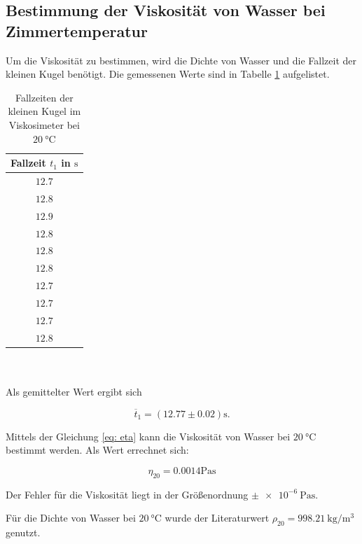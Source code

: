 \subsection{Bestimmung der Viskosität von Wasser bei Zimmertemperatur} \label{sec:visko}
Um die Viskosität zu bestimmen, wird die Dichte von Wasser und die Fallzeit der kleinen Kugel benötigt.
Die gemessenen Werte sind in Tabelle \ref{tab:messwerte_fallzeit_kugel_klein} aufgelistet. %
\begin{table} %
\centering
\begin{tabular} {c}
	\toprule
  Fallzeit $t_1$ in $\si{\second}$ \\
  \midrule
  $\num{12.7}$ \\
  $\num{12.8}$ \\
  $\num{12.9}$ \\
  $\num{12.8}$ \\
  $\num{12.8}$ \\
  $\num{12.8}$ \\
  $\num{12.7}$ \\
  $\num{12.7}$ \\
  $\num{12.7}$ \\
  $\num{12.8}$ \\
\bottomrule
\end{tabular}
\caption{Fallzeiten der kleinen Kugel im Viskosimeter bei $\SI{20}{\degreeCelsius}$}
\label{tab:messwerte_fallzeit_kugel_klein}
\end{table}
\\
\\
\hfill
Als gemittelter Wert ergibt sich

\begin{equation}
\label{eq:gemittelte_fallzeit_klein}
\overline{t}_{1}=\left(\num{12.77}\pm\num{0.02}\right) \si{\second}.
\end{equation}

Mittels der Gleichung \eqref{eq: eta} kann die Viskosität
von Wasser bei $\SI{20}{\degreeCelsius}$ bestimmt werden.
Als Wert errechnet sich:

\begin{equation}
\label{eq:viskosi_wasser}
\eta_{20}= \num{0.0014} \si{\pascal\second}
\end{equation}

Der Fehler für die Viskosität liegt in der Größenordnung $\pm\SI{e-6}{\pascal\second}$. %

Für die Dichte von Wasser bei $\SI{20}{\degreeCelsius}$ wurde der Literaturwert $\rho_{20}=\SI{998.21}{\kilogram\per\cubic\meter}$
genutzt\cite{lit_dichte}.

